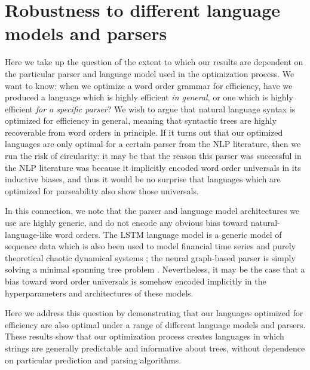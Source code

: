 \documentclass[10pt,twoside,lineno]{article}
\begin{document}
\section{Robustness to different language models and parsers}


Here we take up the question of the extent to which our results are dependent on the particular parser and language model used in the optimization process. We want to know: when we optimize a word order grammar for efficiency, have we produced a language which is highly efficient \emph{in general}, or one which is highly efficient \emph{for a specific parser}? We wish to argue that natural language syntax is optimized for efficiency in general, meaning that syntactic trees are highly recoverable from word orders in principle. If it turns out that our optimized languages are only optimal for a certain parser from the NLP literature, then we run the risk of circularity: it may be that the reason this parser was successful in the NLP literature was because it implicitly encoded word order universals in its inductive biases, and thus it would be no surprise that languages which are optimized for parseability also show those universals.

In this connection, we note that the parser and language model architectures we use are highly generic, and do not encode any obvious bias toward natural-language-like word orders. The LSTM language model is a generic model of sequence data which is also been used to model financial time series \citep{sirignano2018universal} and purely theoretical chaotic dynamical systems \citep{ogunmolu2016nonlinear}; the neural graph-based parser is simply solving a minimal spanning tree problem \citep{mcdonald2005nonprojective}. Nevertheless, it may be the case that a bias toward word order universals is somehow encoded implicitly in the hyperparameters and architectures of these models.

Here we address this question by demonstrating that our languages optimized for efficiency are also optimal under a range of different language models and parsers. These results show that our optimization process creates languages in which strings are generally predictable and informative about trees, without dependence on particular prediction and parsing algorithms.

\end{document}

